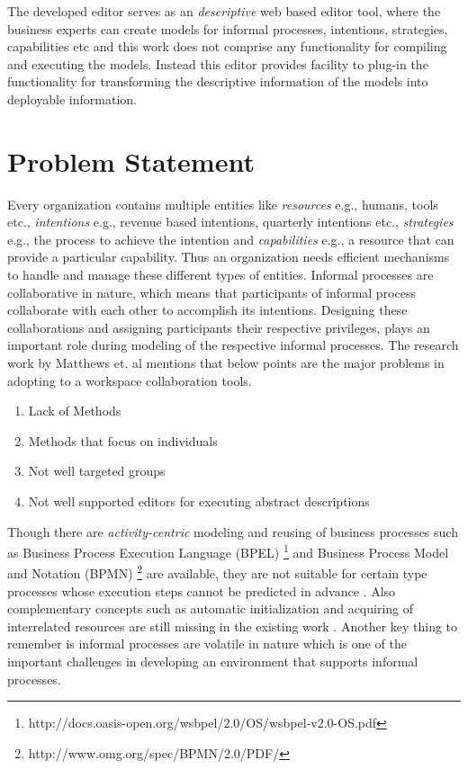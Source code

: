 The developed editor serves as an \textit{descriptive} web based editor tool, where the business experts can create models for informal processes, intentions, strategies, capabilities etc and this work does not comprise any functionality for compiling and executing the models. Instead this editor provides facility to plug-in the functionality for transforming the descriptive information of the models into deployable information. 

\section{Problem Statement}
\label{sec:problemstatement}
 Every organization contains multiple entities like \textit{resources} e.g., humans, tools etc., \textit{intentions} e.g., revenue based intentions, quarterly intentions etc., \textit{strategies} e.g., the process to achieve the intention and \textit{capabilities} e.g., a resource that can provide a particular capability. Thus an organization needs efficient mechanisms to handle and manage these different types of entities. Informal processes are collaborative in nature, which means that participants of informal process collaborate with each other to accomplish its intentions\cite{Sungur2015}. Designing these collaborations and assigning participants their respective privileges, plays an important role during modeling of the respective informal processes. The research work by Matthews et. al \cite{Matthews2011} mentions that below points are the major problems in adopting to a workspace collaboration tools.

\begin{enumerate}
	\item Lack of Methods
	\item Methods that focus on individuals
	\item Not well targeted groups
	\item Not well supported editors for executing abstract descriptions
\end{enumerate}

Though there are \textit{activity-centric} modeling and reusing of business processes such as Business Process Execution Language (BPEL) \footnote{http://docs.oasis-open.org/wsbpel/2.0/OS/wsbpel-v2.0-OS.pdf} and Business Process Model and Notation (BPMN) \footnote{http://www.omg.org/spec/BPMN/2.0/PDF/} are available, they are not suitable for certain type processes whose execution steps cannot be predicted in advance \cite{Sungur2014a}. Also complementary concepts such as automatic initialization and acquiring of interrelated resources are still missing in the existing work \cite{Sungur2015}. Another key thing to remember is informal processes are volatile in nature which is one of the important challenges in developing an environment that supports informal processes.

